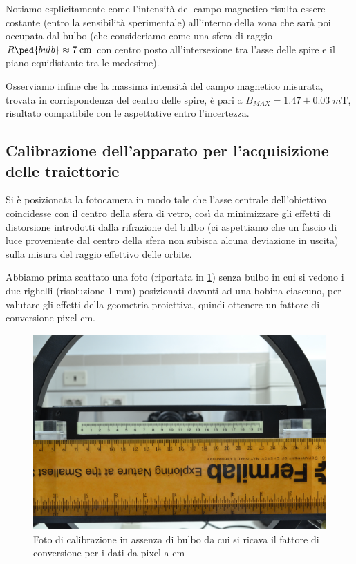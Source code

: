 \documentclass[10pt, a4paper, italian]{article}
\begin{document}
Notiamo esplicitamente come l'intensità del campo magnetico risulta essere
costante (entro la sensibilità sperimentale) all'interno della zona che sarà
poi occupata dal bulbo (che consideriamo come una sfera di raggio
$R\ped{bulb} \approx 7 \; \si{c\m}$ con centro posto all'intersezione tra
l'asse delle spire e il piano equidistante tra le medesime).

Osserviamo infine che la massima intensità del campo magnetico misurata,
trovata in corrispondenza del centro delle spire, è pari a
$B_{MAX} = 1.47 \pm 0.03 \; \si{m\tesla}$, risultato compatibile con le
aspettative entro l'incertezza.

\subsection{Calibrazione dell'apparato per l'acquisizione delle traiettorie}
Si è posizionata la fotocamera in modo tale che l'asse centrale
dell'obiettivo coincidesse con il centro della sfera di vetro, così da
minimizzare gli effetti di distorsione introdotti dalla rifrazione del bulbo
(ci aspettiamo che un fascio di luce proveniente dal centro della sfera non
subisca alcuna deviazione in uscita) sulla misura del raggio effettivo delle
orbite.

Abbiamo prima scattato una foto (riportata in \cref{fig: cal}) senza bulbo
in cui si vedono i due righelli (risoluzione 1 mm) posizionati davanti ad una
bobina ciascuno, per valutare gli effetti della geometria proiettiva, quindi
ottenere un fattore di conversione pixel-cm.
\begin{figure}[htbp]
\includegraphics[width=\textwidth]{cal1}
\caption{Foto di calibrazione in assenza di bulbo da cui si ricava il fattore
di conversione per i dati da pixel a cm \label{fig: cal}}
\end{figure}
\end{document}
